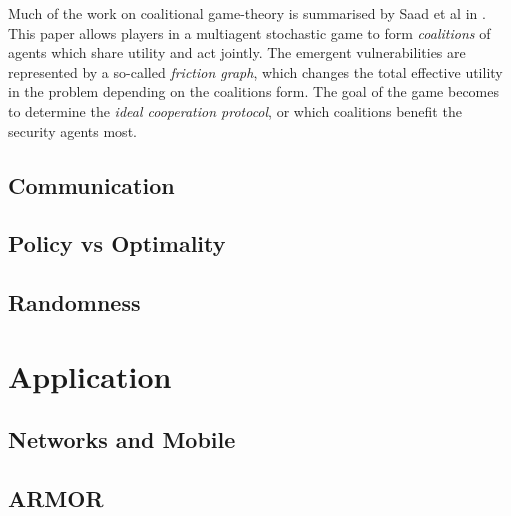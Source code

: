 \documentclass{article}
\begin{document}
Much of the work on coalitional game-theory is summarised by Saad et al in \cite{coalition}.
This paper allows players in a multiagent stochastic game to form {\em coalitions} of agents which share utility and act jointly.
The emergent vulnerabilities are represented by a so-called {\em friction graph}, which changes the total effective utility in the problem depending on the coalitions form.
The goal of the game becomes to determine the {\em ideal cooperation protocol}, or which coalitions benefit the security agents most.

\subsection{Communication}


\subsection{Policy vs Optimality}

\subsection{Randomness}
\label{secRandom}

\section{Application}

\subsection{Networks and Mobile}

\subsection{ARMOR}
\label{secARMOR}

\newpage



\end{document}

